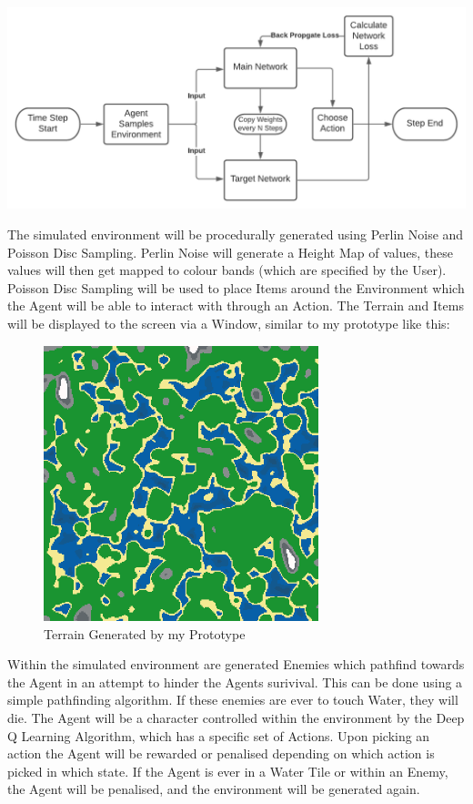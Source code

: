 \begin{flushleft}
            \vspace{0.5cm}
            \centerline{\includegraphics[width=\textwidth]{Images/Design/DualNetwork.png}}
            \vspace{0.5cm}

            The simulated environment will be procedurally generated using Perlin Noise and Poisson Disc Sampling. Perlin Noise will
            generate a Height Map of values, these values will then get mapped to colour bands (which are specified by the User). Poisson
            Disc Sampling will be used to place Items around the Environment which the Agent will be able to interact with through an Action.
            The Terrain and Items will be displayed to the screen via a Window, similar to my prototype like this: \\

            \begin{figure}[H]
                \centering
                \includegraphics[width=8cm]{Images/Prototype/Seed420 Colour.png}
                \caption*{Terrain Generated by my Prototype}
            \end{figure}

            Within the simulated environment are generated Enemies which pathfind towards the Agent in an attempt to hinder the Agents
            surivival. This can be done using a simple pathfinding algorithm. If these enemies are ever to touch Water, they will die. 
            The Agent will be a character controlled within the environment by the Deep Q Learning Algorithm, which has a specific set
            of Actions. Upon picking an action the Agent will be rewarded or penalised depending on which action is picked in which state. If the
            Agent is ever in a Water Tile or within an Enemy, the Agent will be penalised, and the environment will be generated again.


\end{flushleft}
